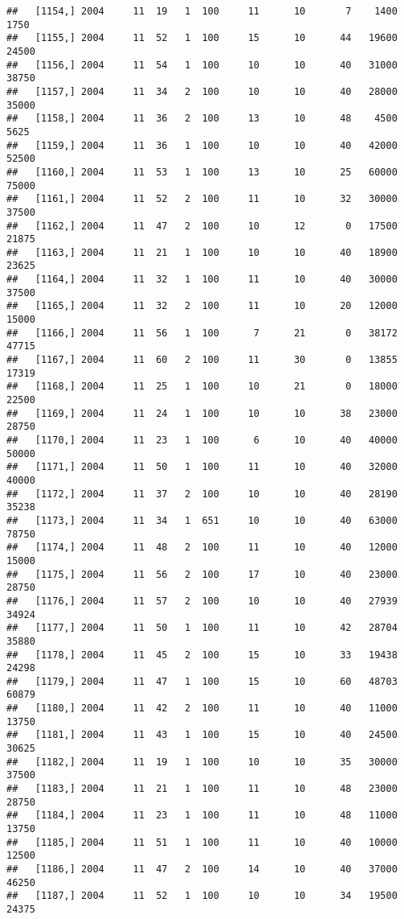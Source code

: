 \documentclass{article}\usepackage[]{graphicx}\usepackage[]{color}
\makeatletter
\newenvironment{kframe}{%
 \def\at@end@of@kframe{}%
 \ifinner\ifhmode%
  \def\at@end@of@kframe{\end{minipage}}%
  \begin{minipage}{\columnwidth}%
 \fi\fi%
 \def\FrameCommand##1{\hskip\@totalleftmargin \hskip-\fboxsep
 \colorbox{shadecolor}{##1}\hskip-\fboxsep
     \hskip-\linewidth \hskip-\@totalleftmargin \hskip\columnwidth}%
 \MakeFramed {\advance\hsize-\width
   \@totalleftmargin\z@ \linewidth\hsize
   \@setminipage}}%
 {\par\unskip\endMakeFramed%
 \at@end@of@kframe}
\newenvironment{knitrout}{}{} %
\makeatother
\begin{document}
\begin{knitrout}
\begin{kframe}
\begin{verbatim}
##   [1154,] 2004     11  19   1  100     11      10       7    1400    1750
##   [1155,] 2004     11  52   1  100     15      10      44   19600   24500
##   [1156,] 2004     11  54   1  100     10      10      40   31000   38750
##   [1157,] 2004     11  34   2  100     10      10      40   28000   35000
##   [1158,] 2004     11  36   2  100     13      10      48    4500    5625
##   [1159,] 2004     11  36   1  100     10      10      40   42000   52500
##   [1160,] 2004     11  53   1  100     13      10      25   60000   75000
##   [1161,] 2004     11  52   2  100     11      10      32   30000   37500
##   [1162,] 2004     11  47   2  100     10      12       0   17500   21875
##   [1163,] 2004     11  21   1  100     10      10      40   18900   23625
##   [1164,] 2004     11  32   1  100     11      10      40   30000   37500
##   [1165,] 2004     11  32   2  100     11      10      20   12000   15000
##   [1166,] 2004     11  56   1  100      7      21       0   38172   47715
##   [1167,] 2004     11  60   2  100     11      30       0   13855   17319
##   [1168,] 2004     11  25   1  100     10      21       0   18000   22500
##   [1169,] 2004     11  24   1  100     10      10      38   23000   28750
##   [1170,] 2004     11  23   1  100      6      10      40   40000   50000
##   [1171,] 2004     11  50   1  100     11      10      40   32000   40000
##   [1172,] 2004     11  37   2  100     10      10      40   28190   35238
##   [1173,] 2004     11  34   1  651     10      10      40   63000   78750
##   [1174,] 2004     11  48   2  100     11      10      40   12000   15000
##   [1175,] 2004     11  56   2  100     17      10      40   23000   28750
##   [1176,] 2004     11  57   2  100     10      10      40   27939   34924
##   [1177,] 2004     11  50   1  100     11      10      42   28704   35880
##   [1178,] 2004     11  45   2  100     15      10      33   19438   24298
##   [1179,] 2004     11  47   1  100     15      10      60   48703   60879
##   [1180,] 2004     11  42   2  100     11      10      40   11000   13750
##   [1181,] 2004     11  43   1  100     15      10      40   24500   30625
##   [1182,] 2004     11  19   1  100     10      10      35   30000   37500
##   [1183,] 2004     11  21   1  100     11      10      48   23000   28750
##   [1184,] 2004     11  23   1  100     11      10      48   11000   13750
##   [1185,] 2004     11  51   1  100     11      10      40   10000   12500
##   [1186,] 2004     11  47   2  100     14      10      40   37000   46250
##   [1187,] 2004     11  52   1  100     10      10      34   19500   24375

\end{verbatim}
\end{kframe}
\end{knitrout}
\end{document}
